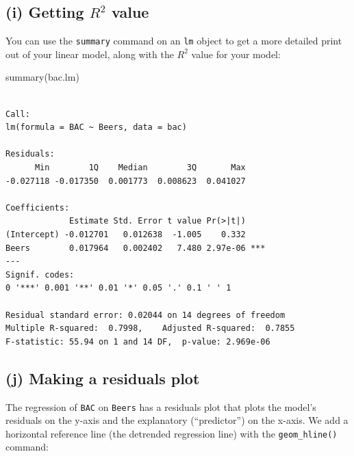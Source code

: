 \documentclass[
]{book}
\newenvironment{Shaded}{\begin{snugshade}}{\end{snugshade}}
\newcommand{\FunctionTok}[1]{\textcolor[rgb]{0.00,0.00,0.00}{#1}}
\newcommand{\NormalTok}[1]{#1}
\begin{document}
\hypertarget{i-getting-r2-value}{%
\subsection{\texorpdfstring{(i) Getting \(R^2\) value}{(i) Getting R\^{}2 value}}\label{i-getting-r2-value}}

You can use the \texttt{summary} command on an \texttt{lm} object to get a more detailed print out of your linear model, along with the \(R^2\) value for your model:

\begin{Shaded}
\begin{Highlighting}[]
\FunctionTok{summary}\NormalTok{(bac.lm)}
\end{Highlighting}
\end{Shaded}

\begin{verbatim}

Call:
lm(formula = BAC ~ Beers, data = bac)

Residuals:
      Min        1Q    Median        3Q       Max 
-0.027118 -0.017350  0.001773  0.008623  0.041027 

Coefficients:
             Estimate Std. Error t value Pr(>|t|)    
(Intercept) -0.012701   0.012638  -1.005    0.332    
Beers        0.017964   0.002402   7.480 2.97e-06 ***
---
Signif. codes:  
0 '***' 0.001 '**' 0.01 '*' 0.05 '.' 0.1 ' ' 1

Residual standard error: 0.02044 on 14 degrees of freedom
Multiple R-squared:  0.7998,    Adjusted R-squared:  0.7855 
F-statistic: 55.94 on 1 and 14 DF,  p-value: 2.969e-06
\end{verbatim}

\hypertarget{j-making-a-residuals-plot}{%
\subsection{(j) Making a residuals plot}\label{j-making-a-residuals-plot}}

The regression of \texttt{BAC} on \texttt{Beers} has a residuals plot that plots the model's residuals on the y-axis and the explanatory (``predictor'') on the x-axis. We add a horizontal reference line (the detrended regression line) with the \texttt{geom\_hline()} command:
\end{document}
